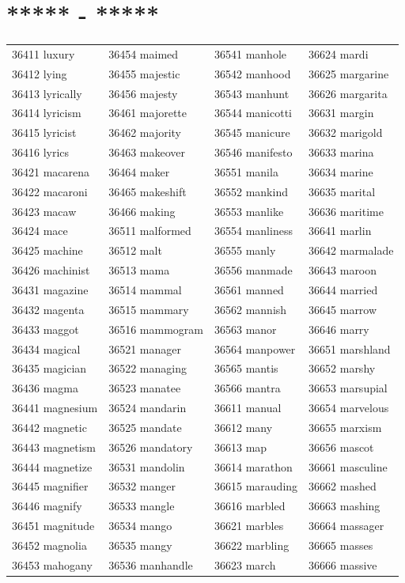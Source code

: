 \documentclass[10pt, oneside]{book}
\begin{document}
\begin{table}[h]
	\centering
	\section*{***** - *****}
	\begin{tabular}{l l l l}
36411 luxury &36454 maimed &36541 manhole &36624 mardi\\
36412 lying &36455 majestic &36542 manhood &36625 margarine\\
36413 lyrically &36456 majesty &36543 manhunt &36626 margarita\\
36414 lyricism &36461 majorette &36544 manicotti &36631 margin\\
36415 lyricist &36462 majority &36545 manicure &36632 marigold\\
36416 lyrics &36463 makeover &36546 manifesto &36633 marina\\
36421 macarena &36464 maker &36551 manila &36634 marine\\
36422 macaroni &36465 makeshift &36552 mankind &36635 marital\\
36423 macaw &36466 making &36553 manlike &36636 maritime\\
36424 mace &36511 malformed &36554 manliness &36641 marlin\\
36425 machine &36512 malt &36555 manly &36642 marmalade\\
36426 machinist &36513 mama &36556 manmade &36643 maroon\\
36431 magazine &36514 mammal &36561 manned &36644 married\\
36432 magenta &36515 mammary &36562 mannish &36645 marrow\\
36433 maggot &36516 mammogram &36563 manor &36646 marry\\
36434 magical &36521 manager &36564 manpower &36651 marshland\\
36435 magician &36522 managing &36565 mantis &36652 marshy\\
36436 magma &36523 manatee &36566 mantra &36653 marsupial\\
36441 magnesium &36524 mandarin &36611 manual &36654 marvelous\\
36442 magnetic &36525 mandate &36612 many &36655 marxism\\
36443 magnetism &36526 mandatory &36613 map &36656 mascot\\
36444 magnetize &36531 mandolin &36614 marathon &36661 masculine\\
36445 magnifier &36532 manger &36615 marauding &36662 mashed\\
36446 magnify &36533 mangle &36616 marbled &36663 mashing\\
36451 magnitude &36534 mango &36621 marbles &36664 massager\\
36452 magnolia &36535 mangy &36622 marbling &36665 masses\\
36453 mahogany &36536 manhandle &36623 march &36666 massive\\
	\end{tabular}
 \end{table}
\end{document}
